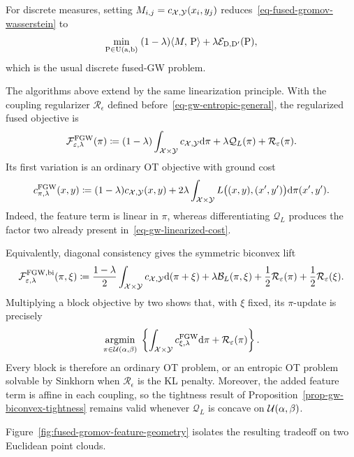 For discrete measures, setting
$M_{i,j}=c_{\mathcal{X},\mathcal{Y}}(x_i,y_j)$
reduces~\eqref{eq-fused-gromov-wasserstein} to
\[
	\underset{\mathrm{P}\in\mathrm{U}(\mathrm{a},\mathrm{b})}{\min}\;
	(1-\lambda)\langle M,\,\mathrm{P}\rangle
	+
	\lambda\mathcal{E}_{\mathrm{D},\mathrm{D}'}(\mathrm{P}),
\]
which is the usual discrete fused-GW problem.

The algorithms above extend by the same linearization principle. With the coupling regularizer $\mathcal R_\epsilon$ defined before~\eqref{eq-gw-entropic-general}, the regularized fused objective is
\[
	\mathcal F_{\varepsilon,\lambda}^{\mathrm{FGW}}(\pi)
	\coloneqq
	(1-\lambda)\int_{\mathcal{X}\times\mathcal{Y}}c_{\mathcal{X},\mathcal{Y}}\mathrm{d}\pi
	+
	\lambda\mathcal Q_L(\pi)
	+
	\mathcal R_\varepsilon(\pi).
\]
Its first variation is an ordinary OT objective with ground cost
\begin{equation}\label{eq-fused-gw-linearized-cost}
	c_{\pi,\lambda}^{\mathrm{FGW}}(x,y)
	\coloneqq
	(1-\lambda)c_{\mathcal{X},\mathcal{Y}}(x,y)
	+
	2\lambda
	\int_{\mathcal{X}\times\mathcal{Y}}
	L\bigl((x,y),(x',y')\bigr)\mathrm{d}\pi(x',y').
\end{equation}
Indeed, the feature term is linear in $\pi$, whereas differentiating $\mathcal Q_L$ produces the factor two already present in~\eqref{eq-gw-linearized-cost}.

Equivalently, diagonal consistency gives the symmetric biconvex lift
\[
	\mathcal F_{\varepsilon,\lambda}^{\mathrm{FGW,bi}}(\pi,\xi)
	\coloneqq
	\frac{1-\lambda}{2}
	\int_{\mathcal{X}\times\mathcal{Y}}c_{\mathcal{X},\mathcal{Y}}\mathrm{d}(\pi+\xi)
	+
	\lambda\mathcal B_L(\pi,\xi)
	+
	\frac12\mathcal R_\varepsilon(\pi)
	+
	\frac12\mathcal R_\varepsilon(\xi).
\]
Multiplying a block objective by two shows that, with $\xi$ fixed, its $\pi$-update is precisely
\[
	\underset{\pi\in\mathcal{U}(\alpha,\beta)}{\operatorname{argmin}}\;
	\left\{
		\int_{\mathcal{X}\times\mathcal{Y}}c_{\xi,\lambda}^{\mathrm{FGW}}\mathrm{d}\pi
		+
		\mathcal R_\varepsilon(\pi)
	\right\}.
\]
Every block is therefore an ordinary OT problem, or an entropic OT problem solvable by Sinkhorn when $\mathcal R_\epsilon$ is the KL penalty. Moreover, the added feature term is affine in each coupling, so the tightness result of Proposition~\ref{prop-gw-biconvex-tightness} remains valid whenever $\mathcal Q_L$ is concave on $\mathcal{U}(\alpha,\beta)$.

Figure~\ref{fig:fused-gromov-feature-geometry} isolates the resulting tradeoff on two Euclidean point clouds.

